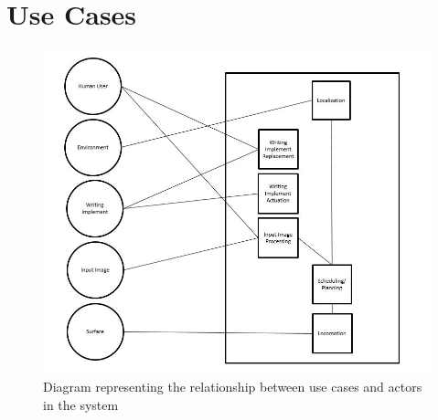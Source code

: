 
\section{Use Cases}
\label{sec:use_cases}

\begin{figure}
 \centering
  \includegraphics[width=0.6\columnwidth]{diagrams/use-cases-diagram.JPG}
	\caption{Diagram representing the relationship between use cases and actors in the system}
 \label{fig:use-cases}
\end{figure}

